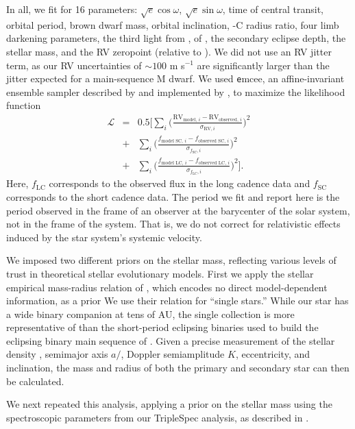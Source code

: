 In all, we fit for 16 parameters: $\sqrt{e}\cos\omega$, $\sqrt{e}\sin\omega$, time of central transit, orbital period, brown dwarf mass, orbital inclination, \LA-C radius ratio, four limb darkening parameters, the third light from \LB, \logg{} of \LA, the secondary eclipse depth, the stellar mass, and the RV zeropoint (relative to \LB). We did not use an RV jitter term, as our RV uncertainties of $\sim 100$ m s$^{-1}$ are significantly larger than the jitter expected for a main-sequence M dwarf. We used {\texttt emcee}, an affine-invariant ensemble sampler described by \citet{Goodman10} and implemented by \citet{Foreman-Mackey12}, to maximize the likelihood function
\begin{eqnarray}
\mathcal{L} &=& 0.5 \bigg[\sum_i \bigg(\frac{\textrm{RV$_{\textrm{model, $i$}}$} - \textrm{RV$_{\textrm{observed, $i$}}$}}{\sigma_{\textrm{RV}, i}}\bigg)^2 \nonumber \\
&+& \sum_i
 \bigg(\frac{f_{\textrm{model SC, $i$}} - f_{\textrm{observed SC, $i$}}}{\sigma_{f _\textrm{SC}, i}}\bigg)^2 \nonumber \\
 &+& \sum_i
 \bigg(\frac{f_{\textrm{model LC, $i$}} - f_{\textrm{observed LC, $i$}}}{\sigma_{f _\textrm{LC}, i}}\bigg)^2\bigg].
\end{eqnarray}
Here, $f_\textrm{LC}$ corresponds to the observed flux in the \itk{} long cadence data and $f_\textrm{SC}$ corresponds to the short cadence data.
The period we fit and report here is the period observed in the frame of an observer at the barycenter of the solar system, not in the frame of the \LHS{} system.
That is, we do not correct for relativistic effects induced by the star system's systemic velocity.

We imposed two different priors on the stellar mass, reflecting various levels of trust in theoretical stellar evolutionary models. 
First we apply the stellar empirical mass-radius relation of \citet{Boyajian12}, which encodes no direct model-dependent information, as a prior
We use their relation for ``single stars.''
While our star has a wide binary companion at tens of AU, the single collection is more representative of \LA{} than the short-period eclipsing binaries used to build the eclipsing binary main sequence of \citet{Boyajian12}.
Given a precise measurement of the stellar density \rhostar, semimajor axis $a/$\rstar, Doppler semiamplitude $K$, eccentricity, and inclination, the mass and radius of both the primary and secondary star can then be calculated.


We next repeated this analysis, applying a prior on the stellar mass using the spectroscopic parameters from our TripleSpec analysis, as described in \textsection{\ref{TripleSpec}}.




